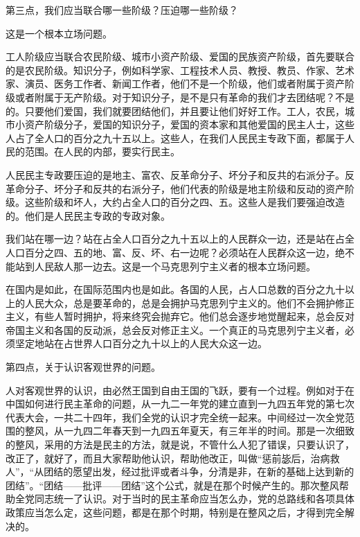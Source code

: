 第三点，我们应当联合哪一些阶级？压迫哪一些阶级？

这是一个根本立场问题。

工人阶级应当联合农民阶级、城市小资产阶级、爱国的民族资产阶级，首先要联合的是农民阶级。知识分子，例如科学家、工程技术人员、教授、教员、作家、艺术家、演员、医务工作者、新闻工作者，他们不是一个阶级，他们或者附属于资产阶级或者附属于无产阶级。对于知识分子，是不是只有革命的我们才去团结呢？不是的。只要他们爱国，我们就要团结他们，并且要让他们好好工作。工人，农民，城市小资产阶级分子，爱国的知识分子，爱国的资本家和其他爱国的民主人士，这些人占了全人口的百分之九十五以上。这些人，在我们人民民主专政下面，都属于人民的范围。在人民的内部，要实行民主。

人民民主专政要压迫的是地主、富农、反革命分子、坏分子和反共的右派分子。反革命分子、坏分子和反共的右派分子，他们代表的阶级是地主阶级和反动的资产阶级。这些阶级和坏人，大约占全人口的百分之四、五。这些人是我们要强迫改造的。他们是人民民主专政的专政对象。

我们站在哪一边？站在占全人口百分之九十五以上的人民群众一边，还是站在占全人口百分之四、五的地、富、反、坏、右一边呢？必须站在人民群众这一边，绝不能站到人民敌人那一边去。这是一个马克思列宁主义者的根本立场问题。

在国内是如此，在国际范围内也是如此。各国的人民，占人口总数的百分之九十以上的人民大众，总是要革命的，总是会拥护马克思列宁主义的。他们不会拥护修正主义，有些人暂时拥护，将来终究会抛弃它。他们总会逐步地觉醒起来，总会反对帝国主义和各国的反动派，总会反对修正主义。一个真正的马克思列宁主义者，必须坚定地站在占世界人口百分之九十以上的人民大众这一边。

第四点，关于认识客观世界的问题。

人对客观世界的认识，由必然王国到自由王国的飞跃，要有一个过程。例如对于在中国如何进行民主革命的问题，从一九二一年党的建立直到一九四五年党的第七次代表大会，一共二十四年，我们全党的认识才完全统一起来。中间经过一次全党范围的整风，从一九四二年春天到一九四五年夏天，有三年半的时间。那是一次细致的整风，采用的方法是民主的方法，就是说，不管什么人犯了错误，只要认识了，改正了，就好了，而且大家帮助他认识，帮助他改正，叫做“惩前毖后，治病救人”，“从团结的愿望出发，经过批评或者斗争，分清是非，在新的基础上达到新的团结”。“团结——批评——团结”这个公式，就是在那个时候产生的。那次整风帮助全党同志统一了认识。对于当时的民主革命应当怎么办，党的总路线和各项具体政策应当怎么定，这些问题，都是在那个时期，特别是在整风之后，才得到完全解决的。

